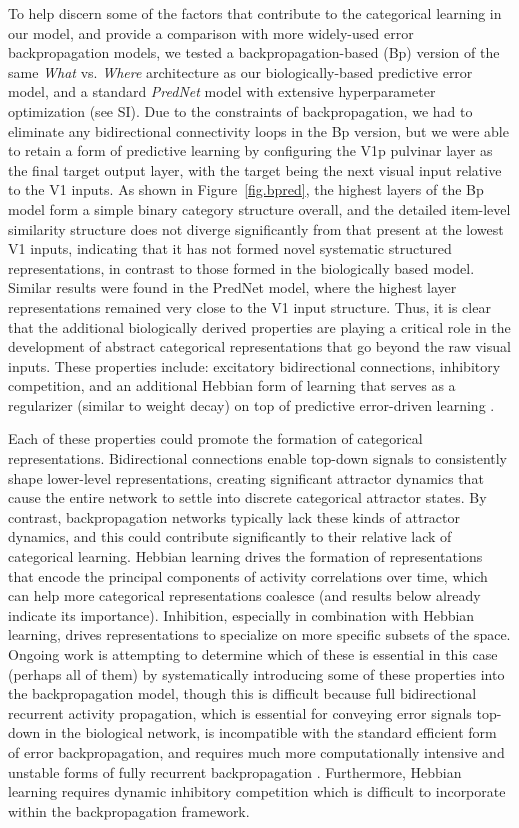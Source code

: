 \documentclass[11pt,twoside]{article}
\newif\myifpdf
\begin{document}
To help discern some of the factors that contribute to the categorical learning in our model, and provide a comparison with more widely-used error backpropagation models, we tested a backpropagation-based (Bp) version of the same \emph{What} vs. \emph{Where} architecture as our biologically-based predictive error model, and a standard \emph{PredNet} model \cite{LotterKreimanCox16} with extensive hyperparameter optimization (see SI).  Due to the constraints of backpropagation, we had to eliminate any bidirectional connectivity loops in the Bp version, but we were able to retain a form of predictive learning by configuring the V1p pulvinar layer as the final target output layer, with the target being the next visual input relative to the V1 inputs.  As shown in Figure~\ref{fig.bpred}, the highest layers of the Bp model form a simple binary category structure overall, and the detailed item-level similarity structure does not diverge significantly from that present at the lowest V1 inputs, indicating that it has not formed novel systematic structured representations, in contrast to those formed in the biologically based model.  Similar results were found in the PredNet model, where the highest layer representations remained very close to the V1 input structure.  Thus, it is clear that the additional biologically derived properties are playing a critical role in the development of abstract categorical representations that go beyond the raw visual inputs. These properties include: excitatory bidirectional connections, inhibitory competition, and an additional Hebbian form of learning that serves as a regularizer (similar to weight decay) on top of predictive error-driven learning \cite{OReilly98,OReillyMunakata00}.

Each of these properties could promote the formation of categorical representations. Bidirectional connections enable top-down signals to consistently shape lower-level representations, creating significant attractor dynamics that cause the entire network to settle into discrete categorical attractor states. By contrast, backpropagation networks typically lack these kinds of attractor dynamics, and this could contribute significantly to their relative lack of categorical learning.  Hebbian learning drives the formation of representations that encode the principal components of activity correlations over time, which can help more categorical representations coalesce (and results below already indicate its importance).  Inhibition, especially in combination with Hebbian learning, drives representations to specialize on more specific subsets of the space.  Ongoing work is attempting to determine which of these is essential in this case (perhaps all of them) by systematically introducing some of these properties into the backpropagation model, though this is difficult because full bidirectional recurrent activity propagation, which is essential for conveying error signals top-down in the biological network, is incompatible with the standard efficient form of error backpropagation, and requires much more computationally intensive and unstable forms of fully recurrent backpropagation \cite{WilliamsZipser92,Pineda87}.  Furthermore, Hebbian learning requires dynamic inhibitory competition which is difficult to incorporate within the backpropagation framework.
\end{document}
